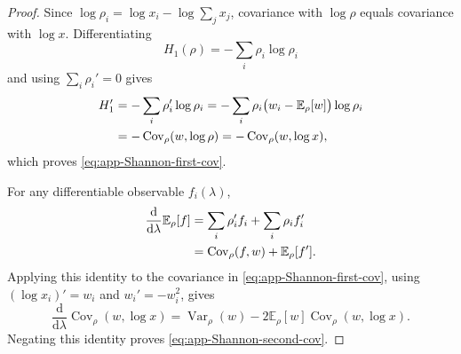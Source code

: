 \documentclass[aps,pra,11pt,onecolumn,nofootinbib,tightenlines]{revtex4-2}
\theoremstyle{definition}
\begin{document}
\begin{proof}
Since $\log \rho_i=\log x_i-\log\sum_jx_j$, covariance with $\log \rho$ equals covariance with $\log x$.  Differentiating
\begin{equation}
 H_1(\rho)=-\sum_i\rho_i\log \rho_i
 \label{eq:app-Shannon-definition}
\end{equation}
and using $\sum_i\rho_i'=0$ gives
\begin{align}
 H_1'
 &=-\sum_i\rho_i'\log \rho_i
 =-\sum_i\rho_i\bigl(w_i-\mathbb E_\rho[w]\bigr)\log \rho_i
 \notag\\
 &=-\operatorname{Cov}_\rho(w,\log \rho)
 =-\operatorname{Cov}_\rho(w,\log x),
 \label{eq:app-Shannon-first-proof}
\end{align}
which proves \eqref{eq:app-Shannon-first-cov}.

For any differentiable observable $f_i(\lambda)$,
\begin{align}
 \frac{\mathrm d}{\mathrm d\lambda}\mathbb E_\rho[f]
 &=\sum_i\rho_i'f_i+\sum_i\rho_if_i'
 \notag\\
 &=\operatorname{Cov}_\rho(f,w)+\mathbb E_\rho[f'].
 \label{eq:app-expectation-derivative}
\end{align}
Applying this identity to the covariance in \eqref{eq:app-Shannon-first-cov}, using $(\log x_i)'=w_i$ and $w_i'=-w_i^2$, gives
\begin{equation}
 \frac{\mathrm d}{\mathrm d\lambda}
 \operatorname{Cov}_\rho(w,\log x)
 =\operatorname{Var}_\rho(w)
 -2\mathbb E_\rho[w]\operatorname{Cov}_\rho(w,\log x).
 \label{eq:app-covariance-derivative-Shannon}
\end{equation}
Negating this identity proves \eqref{eq:app-Shannon-second-cov}.
\end{proof}
\end{document}
